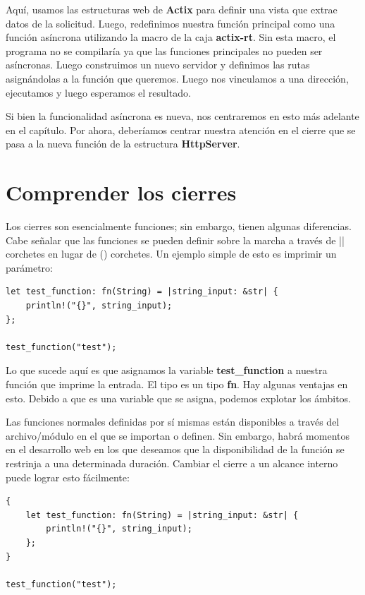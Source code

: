 Aquí, usamos las estructuras web de \textbf{Actix} para definir una vista que extrae datos de la solicitud. Luego, redefinimos nuestra función principal como una función asíncrona utilizando la macro de la caja \textbf{actix-rt}. Sin esta macro, el programa no se compilaría ya que las funciones principales no pueden ser asíncronas. Luego construimos un nuevo servidor y definimos las rutas asignándolas a la función que queremos. Luego nos vinculamos a una dirección, ejecutamos y luego esperamos el resultado.

Si bien la funcionalidad asíncrona es nueva, nos centraremos en esto más adelante en el capítulo. Por ahora, deberíamos centrar nuestra atención en el cierre que se pasa a la nueva función de la estructura \textbf{HttpServer}.

\section{Comprender los cierres}

Los cierres son esencialmente funciones; sin embargo, tienen algunas diferencias. Cabe señalar que las funciones se pueden definir sobre la marcha a través de || corchetes en lugar de () corchetes. Un ejemplo simple de esto es imprimir un parámetro:


\begin{lstlisting}
let test_function: fn(String) = |string_input: &str| {
	println!("{}", string_input);
};

test_function("test");
\end{lstlisting}

Lo que sucede aquí es que asignamos la variable \textbf{test\_function} a nuestra función que imprime la entrada. El tipo es un tipo \textbf{fn}. Hay algunas ventajas en esto. Debido a que es una variable que se asigna, podemos explotar los ámbitos.

Las funciones normales definidas por sí mismas están disponibles a través del archivo/módulo en el que se importan o definen. Sin embargo, habrá momentos en el desarrollo web en los que deseamos que la disponibilidad de la función se restrinja a una determinada duración. Cambiar el cierre a un alcance interno puede lograr esto fácilmente:

\begin{lstlisting}
{
	let test_function: fn(String) = |string_input: &str| {		
		println!("{}", string_input);
	};
}

test_function("test");
\end{lstlisting}


